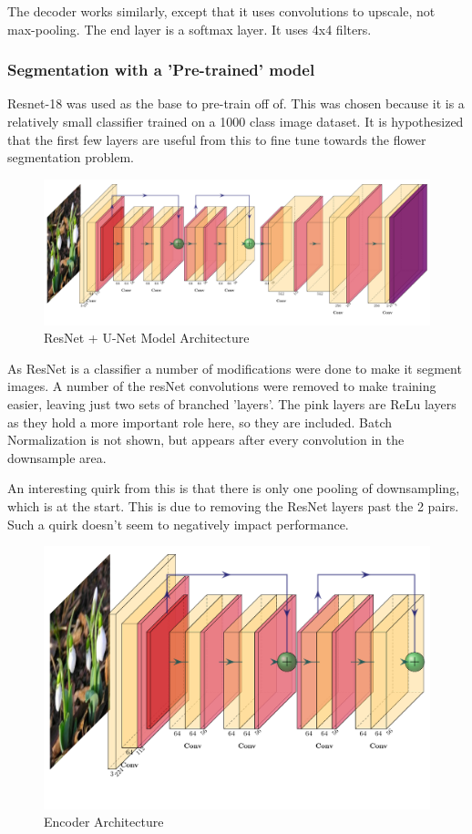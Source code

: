 \documentclass{article}
\begin{document}
The decoder works similarly, except that it uses convolutions to upscale, not max-pooling. The end layer is a softmax layer. It uses 4x4 filters.

\subsubsection{Segmentation with a 'Pre-trained' model}

Resnet-18 was used as the base to pre-train off of. This was chosen because it is a relatively small classifier trained on a 1000 class image dataset. It is hypothesized that the first few layers are useful from this to fine tune towards the flower segmentation problem. 

\begin{figure}[H]
    \centering
    \includegraphics[width=\linewidth]{resnetUnet.pdf}
    \caption{ResNet + U-Net Model Architecture}
\end{figure}

As ResNet is a classifier a number of modifications were done to make it segment images. A number of the resNet convolutions were removed to make training easier, leaving just two sets of branched 'layers'. The pink layers are ReLu layers as they hold a more important role here, so they are included. Batch Normalization is not shown, but appears after every convolution in the downsample area.

An interesting quirk from this is that there is only one pooling of downsampling, which is at the start. This is due to removing the ResNet layers past the 2 pairs. Such a quirk doesn't seem to negatively impact performance.

\begin{figure}[H]
    \centering
    \includegraphics[width=\linewidth]{resnetUnetEncode.pdf}
    \caption{Encoder Architecture}
\end{figure} 
\end{document}
